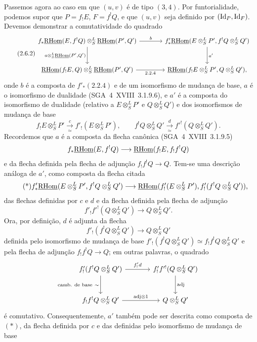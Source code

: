 \enlargethispage{-2\baselineskip}
Passemos agora ao caso em que $(u,v)$ é de tipo $(3,4)$. Por funtorialidade, podemos supor que $P=f_{!}E$, $F=f^{!}Q$, e que $(u,v)$ seja definido por $(\mathrm{Id}_P,\mathrm{Id}_F)$. Devemos demonstrar a comutatividade do quadrado
\begin{equation}\tag{2.6.2}
\begin{tikzcd}[column sep=large,row sep=large]
f_*\uRHom(E,f^!Q)\otimes^L_S\uRHom(P',Q') \arrow[r,"b"] \arrow[d,"{a\otimes^L_S\uRHom(P',Q')}"'] & f'_*\uRHom(E\otimes^L_SP',f^!Q\otimes^L_SQ') \arrow[d,"a'"]\\
\uRHom(f_!E,Q)\otimes^L_S\uRHom(P',Q') \arrow[r,"2.2.4"'] & \uRHom(f_!E\otimes^L_SP',Q\otimes^L_SQ'),
\end{tikzcd}
\end{equation}
onde $b$ é a composta de $f'_*(2.2.4)$ e de um isomorfismo de mudança de base, $a$ é o isomorfismo de dualidade (SGA~4~XVIII~3.1.9.6), e $a'$ é a composta do isomorfismo de dualidade (relativo a $E\otimes^L_SP'$ e $Q\otimes^L_SQ'$) e dos isomorfismos de mudança de base
\[
f_!E\otimes^L_SP'\xrightarrow[\simeq]{c}f'_!(E\otimes^L_SP'),
\qquad
f^!Q\otimes^L_SQ'\xrightarrow[\simeq]{d}f'^!(Q\otimes^L_SQ').
\]
Recordemos que $a$ é a composta da flecha canônica (SGA~4~XVIII~3.1.9.5)
\[
f_*\underline{\mathrm{RHom}}(E,f^!Q)\longrightarrow\underline{\mathrm{RHom}}(f_!E,f_!f^!Q)
\]
e da flecha definida pela flecha de adjunção $f_!f^!Q\to Q$. Tem-se uma descrição análoga de $a'$, como composta da flecha citada
\begin{equation}\tag{*}
f'_*\underline{\mathrm{RHom}}(E\otimes^L_SP',f^!Q\otimes^L_SQ')\longrightarrow
\underline{\mathrm{RHom}}(f'_!(E\otimes^L_SP'),f'_!(f^!Q\otimes^L_SQ')),
\end{equation}
das flechas definidas por $c$ e $d$ e da flecha definida pela flecha de adjunção
\[
f'_!f'^!(Q\otimes^L_SQ')\longrightarrow Q\otimes^L_SQ'.
\]
Ora, por definição, $d$ é adjunta da flecha
\[
f'_!(f^!Q\otimes^L_SQ')\longrightarrow Q\otimes^L_SQ'
\]
definida pelo isomorfismo de mudança de base $f'_!(f^!Q\otimes^L_SQ')\simeq f_!f^!Q\otimes^L_SQ'$ e pela flecha de adjunção $f_!f^!Q\to Q$; em outras palavras, o quadrado
\[
\begin{tikzcd}[column sep=large,row sep=large]
f'_!(f^!Q\otimes^L_SQ') \arrow[r,"{f'_!d}"] \arrow[d,"{\text{camb. de base}\ \sim}"'] & f'_!f'^!(Q\otimes^L_SQ') \arrow[d,"\mathrm{adj}"]\\
f_!f^!Q\otimes^L_SQ' \arrow[r,"{\mathrm{adj}\otimes 1}"] & Q\otimes^L_SQ'
\end{tikzcd}
\]
é comutativo. Consequentemente, $a'$ também pode ser descrita como composta de $(*)$, da flecha definida por $c$ e das definidas pelo isomorfismo de mudança de base
